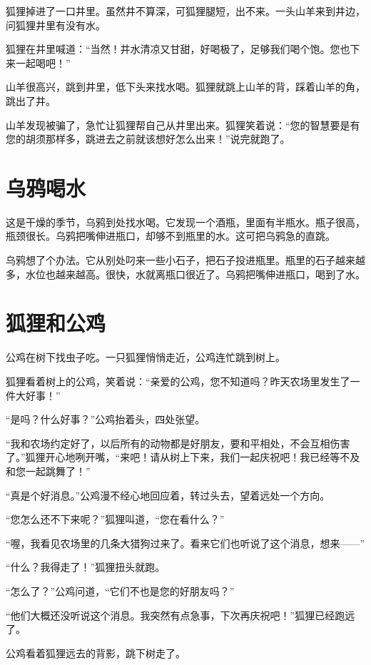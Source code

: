 \documentclass[12pt,UTF-8,openany]{ctexbook}
\begin{document}
\begin{large}
    
    狐狸掉进了一口井里。虽然井不算深，可狐狸腿短，出不来。一头山羊来到井边，问狐狸井里有没有水。
    
    狐狸在井里喊道：“当然！井水清凉又甘甜，好喝极了，足够我们喝个饱。您也下来一起喝吧！”
    
    山羊很高兴，跳到井里，低下头来找水喝。狐狸就跳上山羊的背，踩着山羊的角，跳出了井。
    
    山羊发现被骗了，急忙让狐狸帮自己从井里出来。狐狸笑着说：“您的智慧要是有您的胡须那样多，跳进去之前就该想好怎么出来！”说完就跑了。
    
\end{large}



\chapter{乌鸦喝水}

\begin{large}
    
    这是干燥的季节，乌鸦到处找水喝。它发现一个酒瓶，里面有半瓶水。瓶子很高，瓶颈很长。乌鸦把嘴伸进瓶口，却够不到瓶里的水。这可把乌鸦急的直跳。
    
    乌鸦想了个办法。它从别处叼来一些小石子，把石子投进瓶里。瓶里的石子越来越多，水位也越来越高。很快，水就离瓶口很近了。乌鸦把嘴伸进瓶口，喝到了水。
    
\end{large}



\chapter{狐狸和公鸡}

\begin{large}
    
    公鸡在树下找虫子吃。一只狐狸悄悄走近，公鸡连忙跳到树上。
    
    狐狸看着树上的公鸡，笑着说：“亲爱的公鸡，您不知道吗？昨天农场里发生了一件大好事！”
    
    “是吗？什么好事？”公鸡抬着头，四处张望。
    
    “我和农场约定好了，以后所有的动物都是好朋友，要和平相处，不会互相伤害了。”狐狸开心地咧开嘴，“来吧！请从树上下来，我们一起庆祝吧！我已经等不及和您一起跳舞了！”
    
    “真是个好消息。”公鸡漫不经心地回应着，转过头去，望着远处一个方向。
    
    “您怎么还不下来呢？”狐狸叫道，“您在看什么？”
    
    “喔，我看见农场里的几条大猎狗过来了。看来它们也听说了这个消息，想来——”
    
    “什么？我得走了！”狐狸扭头就跑。
    
    “怎么了？”公鸡问道，“它们不也是您的好朋友吗？”
    
    “他们大概还没听说这个消息。我突然有点急事，下次再庆祝吧！”狐狸已经跑远了。
    
    公鸡看着狐狸远去的背影，跳下树走了。
    
\end{large}
\end{document}
